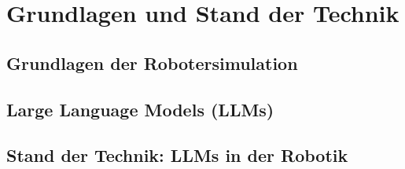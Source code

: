 \chapter{Grundlagen und Stand der Technik}
\label{cap:Grundlagen}

\section{Grundlagen der Robotersimulation}
\label{sec:Grundlagen_Robotersimulation}

\section{Large Language Models (LLMs)}
\label{sec:Grundlagen_LLMs}

\section{Stand der Technik: LLMs in der Robotik}
\label{sec:Stand_der_Technik_LLMs_Robotik}
